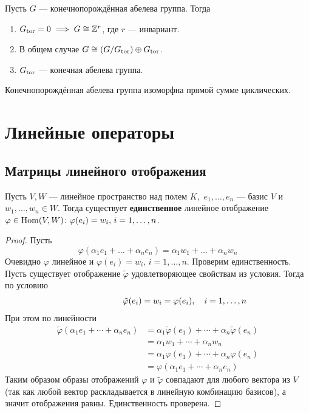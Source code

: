 \documentclass[../main.tex]{subfiles}
\begin{document}
\begin{statement}
  Пусть $G$ --- конечнопорождённая абелева группа. Тогда
  \begin{enumerate}
    \item $G_{\operatorname{tor}} = 0 \implies G \cong \mathbb{Z}^r$, где $r$ --- инвариант.
    \item В общем случае $G \cong (G/G_{\operatorname{tor}}) \oplus G_{\operatorname{tor}}$.
    \item $G_{\operatorname{tor}}$ --- конечная абелева группа.
  \end{enumerate}
\end{statement}
\begin{corollary*}
  Конечнопорождённая абелева группа изоморфна прямой сумме циклических.
\end{corollary*}

\chapter{Линейные операторы}
\section{Матрицы линейного отображения}

\begin{theorem-non}
  Пусть $V, W$ --- линейное пространство над полем $K$,\ $e_1, \dotsc, e_n$ --- базис $V$ и $w_1, \dotsc, w_n \in W$. Тогда существует \textbf{единственное} линейное отображение $\varphi \in \operatorname{Hom}(V, W)\colon \varphi(e_i) = w_i,\, i = 1,\dotsc,n$.
\end{theorem-non}
\begin{proof}
  Пусть
  \begin{equation*}
    \varphi(\alpha_1 e_1 + \dotsc + \alpha_n e_n) = \alpha_1 w_1 + \dotsc + \alpha_n w_n
  \end{equation*}
  Очевидно $\varphi$ линейное и $\varphi(e_i) = w_i,\, i = 1,\dotsc,n$. Проверим единственность. Пусть существует отображение $\tilde{\varphi}$ удовлетворяющее свойствам из условия. Тогда по условию
  \begin{align*}
    \hphantom{,\quad i = 1,\dotsc, n}
    \tilde{\varphi}(e_i) = w_i = \varphi(e_i),\quad i = 1,\dotsc, n
  \end{align*}
  При этом по линейности
  \begin{align*}
    \tilde{\varphi}(\alpha_1 e_1 + \dotsb + \alpha_n  e_n)
    &=
    \alpha_1 \tilde{\varphi}(e_1) + \dotsb + \alpha_n \tilde{\varphi}(e_n)
    \\&=
    \alpha_1 w_1 + \dotsb + \alpha_n w_n
    \\&=
    \alpha_1 \varphi(e_1) + \dotsb + \alpha_n \varphi(e_n)
    \\&=
    \varphi(\alpha_1 e_1 + \dotsb + \alpha_n e_n)
  \end{align*}
  Таким образом образы отображений $\varphi$ и $\tilde{\varphi}$ совпадают для любого вектора из $V$(так как любой вектор раскладывается в линейную комбинацию базисов), а значит отображения равны. Единственность проверена.
\end{proof}
\end{document}
